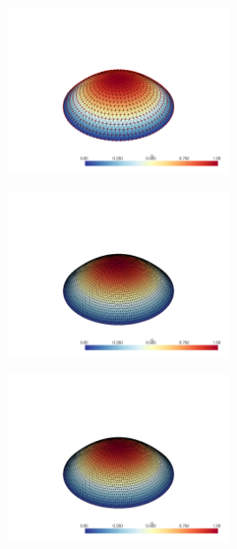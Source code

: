 \documentclass[
  11pt,
]{article}
\let\origfigure\figure
\let\endorigfigure\endfigure
\renewenvironment{figure}[1][2] {
    \expandafter\origfigure\expandafter[H]
} {
    \endorigfigure
}
\begin{document}
\begin{figure}
\centering
\includegraphics[width=0.5\textwidth,height=\textheight]{../img/mesh3-gauss19.png}
\caption{Finite element solution for problem 1 over mesh number 3 and
order-19 numerical integration.}
\end{figure}

\begin{figure}
\centering
\includegraphics[width=0.5\textwidth,height=\textheight]{../img/mesh4-gauss02.png}
\caption{Finite element solution for problem 1 over mesh number 4 and
order-2 numerical integration.}
\end{figure}

\begin{figure}
\centering
\includegraphics[width=0.5\textwidth,height=\textheight]{../img/mesh4-gauss05.png}
\caption{Finite element solution for problem 1 over mesh number 4 and
order-5 numerical integration.}
\end{figure}
\end{document}
